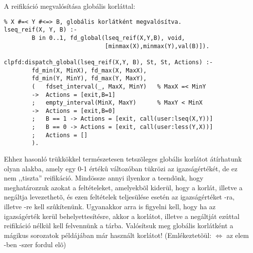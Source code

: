 A reifikáció megvalósítása globális korláttal:

\begin{verbatim}
% X #=< Y #<=> B, globális korlátként megvalósítva.
lseq_reif(X, Y, B) :-
        B in 0..1, fd_global(lseq_reif(X,Y,B), void,       
                             [minmax(X),minmax(Y),val(B)]).

clpfd:dispatch_global(lseq_reif(X,Y, B), St, St, Actions) :-
        fd_min(X, MinX), fd_max(X, MaxX),
        fd_min(Y, MinY), fd_max(Y, MaxY),
        (   fdset_interval(_, MaxX, MinY)   % MaxX =< MinY
        ->  Actions = [exit,B=1]  
        ;   empty_interval(MinX, MaxY)      % MaxY < MinX
        ->  Actions = [exit,B=0]
        ;   B == 1 -> Actions = [exit, call(user:lseq(X,Y))]
        ;   B == 0 -> Actions = [exit, call(user:less(Y,X))]
        ;   Actions = []
        ).
\end{verbatim}

Ehhez hasonló trükkökkel természetesen tetszõleges globális korlátot átírhatunk
olyan alakba, amely egy 0-1 értékû változóban tükrözi az igazságértékét, de
ez nem ,,tiszta'' reifikáció. Mindössze annyi ilyenkor a teendõnk, hogy meghatározzuk
azokat a feltételeket, amelyekbõl kiderül, hogy a korlát, illetve a negáltja levezethetõ,
és ezen feltételek teljesülése esetén az igazságértéket -ra, illetve -re
kell szûkítenünk. Ugyanakkor arra is figyelni kell, hogy ha az igazságérték kerül
behelyettesítésre, akkor a korlátot, illetve a negáltját ezúttal reifikáció nélkül
kell felvennünk a tárba.
\br
Valósítsuk meg globális korlátként a mágikus sorozatok példájában már használt
 korlátot! (Emlékeztetõül:  $\Leftrightarrow$
az  elem -ben -szer fordul elõ)

